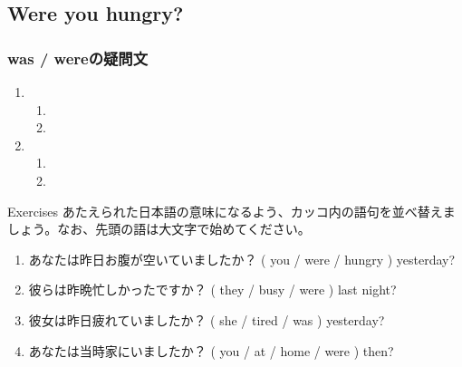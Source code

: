 \documentclass[aspectratio=169,xcolor={dvipsnames,table}]{beamer}
\newcommand{\myaudio}[1]{\href{#1}{\faVolumeUp}}
\begin{document}
\subsection{Were you hungry?}
\begin{frame}[plain]\frametitle{was / wereの疑問文}
\Large

\begin{enumerate}
 \item \begin{enumerate}\Large
	\item {}
	\item {}
       \end{enumerate}
 \item \begin{enumerate}\Large
	\item {}
	\item {}
       \end{enumerate}
\end{enumerate}


\hfill\myaudio{./audio/024_past_be_06.mp3}

\end{frame}


\begin{frame}[plain]{Exercises}
あたえられた日本語の意味になるよう、カッコ内の語句を並べ替えましょう。なお、先頭の語は大文字で始めてください。 
 \begin{enumerate}
	    \item あなたは昨日お腹が空いていましたか？
( you / were / hungry ) yesterday?\\
    \item 彼らは昨晩忙しかったですか？
( they / busy / were ) last night?\\
	    \item 彼女は昨日疲れていましたか？
( she / tired / was ) yesterday?\\
	    \item あなたは当時家にいましたか？
( you / at / home / were ) then?\\

 \end{enumerate}
\hfill\myaudio{./audio/024_past_be_07.mp3}

\end{frame}
\end{document}
